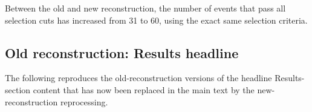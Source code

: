 \begin{table}[htbp]
\centering
{}
\caption{Old reconstruction: beam-on and beam-off events per hour with the corresponding ratio for various selection cuts, considering all the available time with the spill on. This is the old-reconstruction cascade that Table~\ref{tab:onoff_ratio_alltps} in the main text has now replaced.}
\label{tab:onoff_ratio_alltps_v1}
\end{table}

Between the old and new reconstruction, the number of events that pass all selection cuts has increased from 31 to 60, using the exact same selection criteria. 





\subsection{Old reconstruction: Results headline}

The following reproduces the old-reconstruction versions of the headline Results-section content that has now been replaced in the main text by the new-reconstruction reprocessing.

